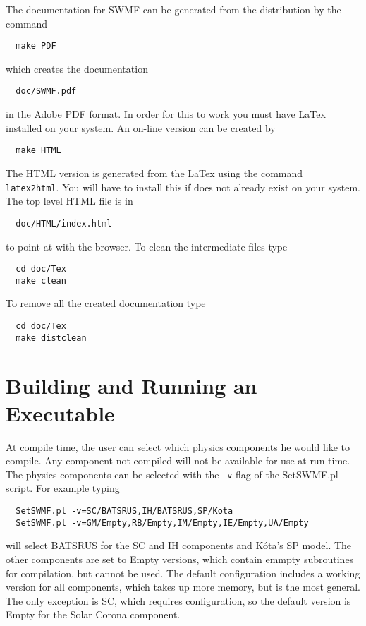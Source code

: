 The documentation for SWMF can be generated from the distribution by
the command
\begin{verbatim}
  make PDF
\end{verbatim}
which creates the documentation
\begin{verbatim}
  doc/SWMF.pdf
\end{verbatim}
in the Adobe PDF format.  In order for this to work you must have
LaTex installed on your system.  An on-line version can be created by
\begin{verbatim}
  make HTML
\end{verbatim}
The HTML version is generated from the LaTex using the command {\tt
  latex2html}.  You will have to install this if does not already exist
  on your system.
The top level HTML file is in
\begin{verbatim}
  doc/HTML/index.html
\end{verbatim}
to point at with the browser.  To clean the intermediate files type
\begin{verbatim}
  cd doc/Tex
  make clean
\end{verbatim}
To remove all the created documentation type
\begin{verbatim}
  cd doc/Tex
  make distclean
\end{verbatim}

\section{Building and Running an Executable}

At compile time, the user can select which physics components he would
like to compile.  Any component not compiled will not be available for
use at run time.  The physics components can be selected with the {\tt -v} flag
of the SetSWMF.pl script. For example typing
\begin{verbatim}
  SetSWMF.pl -v=SC/BATSRUS,IH/BATSRUS,SP/Kota
  SetSWMF.pl -v=GM/Empty,RB/Empty,IM/Empty,IE/Empty,UA/Empty
\end{verbatim}
will select BATSRUS for the SC and IH components and K\'ota's SP model.
The other components are set to Empty versions, which contain emmpty
subroutines for compilation, but cannot be used.
The default configuration includes a working version for all components, 
which takes up more memory, but is the most general.
The only exception is SC, which requires configuration, so the 
default version is Empty for the Solar Corona component.

